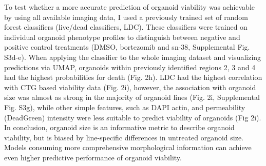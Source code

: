 \begin{flushleft}
To test whether a more accurate prediction of organoid viability was achievable by using all available imaging data, I used a previously trained set of random forest classifiers (live/dead classifiers, LDC). These classifiers were trained on individual organoid phenotype profiles to distinguish between negative and positive control treatments (DMSO, bortezomib and sn-38, Supplemental Fig. S3d-e). When applying the classifier to the whole imaging dataset and visualizing predictions via UMAP, organoids within previously identified regions 2, 3 and 4 had the highest probabilities for death (Fig. 2h). LDC had the highest correlation with CTG based viability data (Fig. 2i), however, the association with organoid size was almost as strong in the majority of organoid lines (Fig. 2i, Supplemental Fig. S3g), while other simple features, such as DAPI actin, and permeability (DeadGreen) intensity were less suitable to predict viability of organoids (Fig 2i). In conclusion, organoid size is an informative metric to describe organoid viability, but is biased by line-specific differences in untreated organoid size. Models consuming more comprehensive morphological information can achieve even higher predictive performance of organoid viability. 


\end{flushleft}
